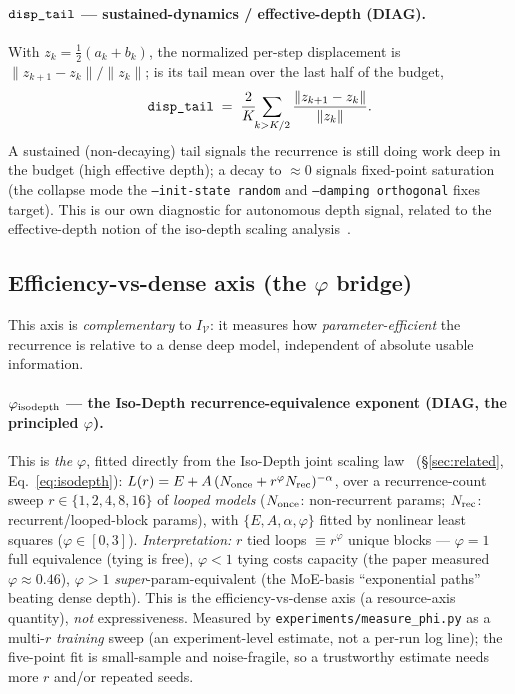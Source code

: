 \documentclass[11pt]{article}
\newcommand{\code}[1]{\texttt{#1}}
\newcommand{\DIAG}{\textcolor{diag}{\textbf{DIAG}}}
\begin{document}
\paragraph{\(\code{\detokenize{disp_tail}}\) --- sustained-dynamics / effective-depth (\DIAG).}
With \(z_k=\tfrac12(a_k+b_k)\), the normalized per-step displacement is \(\lVert z_{k+1}-z_k\rVert/\lVert
z_k\rVert\); \code{} is its tail mean over the last half of the budget,
\begin{equation}
\label{eq:disp-tail}
  \code{\detokenize{disp_tail}}
  \;=\;
  \frac{2}{K}\!\!\sum_{k>K/2}\frac{\lVert z_{k+1}-z_k\rVert}{\lVert z_k\rVert}.
\end{equation}
A sustained (non-decaying) tail signals the recurrence is still doing work deep in the budget (high
effective depth); a decay to \(\approx0\) signals fixed-point saturation (the collapse mode the
\code{--init-state random} and \code{--damping orthogonal} fixes target).  This is our own diagnostic
for autonomous depth signal, related to the effective-depth notion of the iso-depth scaling
analysis~\cite{isodepth}.

\subsection{Efficiency-vs-dense axis (the \texorpdfstring{$\varphi$}{phi} bridge)}
\label{ssec:efficiency}
This axis is \emph{complementary} to \(I_{\mathcal V}\): it measures how \emph{parameter-efficient} the
recurrence is relative to a dense deep model, independent of absolute usable information.

\paragraph{\(\varphi_{\rm isodepth}\) --- the Iso-Depth recurrence-equivalence exponent (\DIAG, the principled \(\varphi\)).}
This is \emph{the} \(\varphi\), fitted directly from the Iso-Depth joint scaling law~\cite{isodepth}
(\S\ref{sec:related}, Eq.~\eqref{eq:isodepth}):
\(L(r)=E+A\,(N_{\rm once}+r^{\varphi}N_{\rm rec})^{-\alpha}\), over a recurrence-count sweep
\(r\in\{1,2,4,8,16\}\) of \emph{looped models} (\(N_{\rm once}\): non-recurrent params; \(N_{\rm
rec}\): recurrent/looped-block params), with \(\{E,A,\alpha,\varphi\}\) fitted by nonlinear least
squares (\(\varphi\in[0,3]\)).  \emph{Interpretation:} \(r\) tied loops \(\equiv r^{\varphi}\) unique
blocks --- \(\varphi=1\) full equivalence (tying is free), \(\varphi<1\) tying costs capacity (the paper
measured \(\varphi\approx0.46\)), \(\varphi>1\) \emph{super}-param-equivalent (the MoE-basis
``exponential paths'' beating dense depth).  This is the efficiency-vs-dense axis (a resource-axis
quantity), \emph{not} expressiveness.  Measured by \code{experiments/measure\_phi.py} as a multi-\(r\)
\emph{training} sweep (an experiment-level estimate, not a per-run log line); the five-point fit is
small-sample and noise-fragile, so a trustworthy estimate needs more \(r\) and/or repeated seeds.
\end{document}
